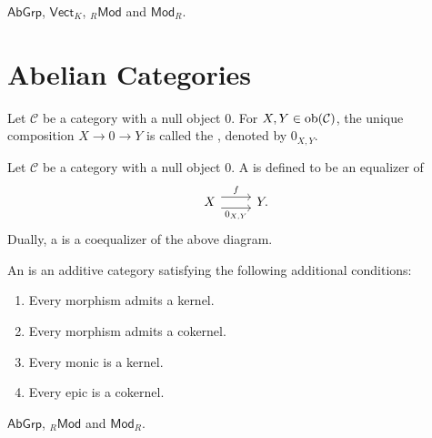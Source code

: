 \begin{examples}
	$\mathsf{AbGrp}$, $\mathsf{Vect}_K$, $_{R}\mathsf{Mod}$ and $\mathsf{Mod}_R$.	
\end{examples}

\section{Abelian Categories}

\begin{definition}
	Let $\mathcal{C}$ be a category with a null object $0$. For $X,Y \in \operatorname{ob}(\mathcal{C})$, the unique composition $X \to 0 \to Y$ is called the , denoted by $0_{X,Y}$.
\end{definition}

\begin{definition}
	Let $\mathcal{C}$ be a category with a null object $0$. A  is defined to be an equalizer of
	\begin{equation*}
		\begin{tikzcd}
			X \arrow[r, shift left = 1ex, "f"]\arrow[r,shift right = 1ex,"0_{X,Y}"'] & Y.
		\end{tikzcd}
	\end{equation*}
	Dually, a  is a coequalizer of the above diagram. 
\end{definition}

\begin{definition}
	An  is an additive category satisfying the following additional conditions:
	\begin{enumerate}[label = \textup{(}\alph*\textup{)}, wide = 0pt]
		\item Every morphism admits a kernel.
		\item Every morphism admits a cokernel.
		\item Every monic is a kernel.
		\item Every epic is a cokernel.
	\end{enumerate}
\end{definition}

\begin{examples}
	$\mathsf{AbGrp}$, $_{R}\mathsf{Mod}$ and $\mathsf{Mod}_R$.	
\end{examples}


